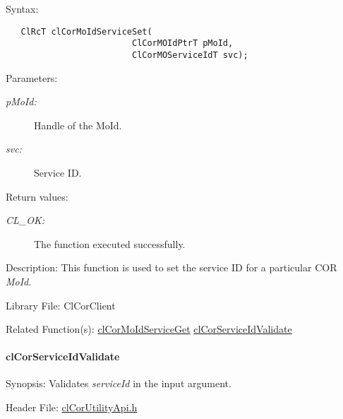 \begin{Desc}
\item[Syntax:]

\footnotesize\begin{verbatim}   ClRcT clCorMoIdServiceSet(
                         ClCorMOIdPtrT pMoId,
                         ClCorMOServiceIdT svc);
\end{verbatim}
\normalsize
\end{Desc}
\begin{Desc}
\item[Parameters:]
\begin{description}
\item[{\em p\-Mo\-Id:}]Handle of the Mo\-Id. \item[{\em svc:}]Service ID.\end{description}
\end{Desc}
\begin{Desc}
\item[Return values:]
\begin{description}
\item[{\em CL\_\-OK:}]The function executed successfully.\end{description}
\end{Desc}
\begin{Desc}
\item[Description:]This function is used to set the service ID for a particular COR {\em Mo\-Id\/}.\end{Desc}
\begin{Desc}
\item[Library File:]Cl\-Cor\-Client\end{Desc}
\begin{Desc}
\item[Related Function(s):]\hyperlink{group__group13}{cl\-Cor\-Mo\-Id\-Service\-Get} \hyperlink{group__group13}{cl\-Cor\-Service\-Id\-Validate} \end{Desc}
\hypertarget{pagecor248}{}\paragraph{cl\-Cor\-Service\-Id\-Validate}\label{pagecor248}
\begin{Desc}
\item[Synopsis:]Validates {\em service\-Id\/} in the input argument.\end{Desc}
\begin{Desc}
\item[Header File:]\hyperlink{cl_cor_utility_api_8h}{cl\-Cor\-Utility\-Api.h}\end{Desc}
